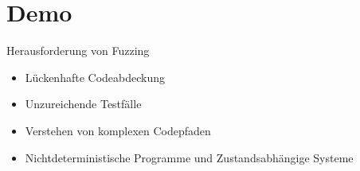 \section{Demo}\label{sec:demo2}
\begin{frame}{Herausforderung von Fuzzing}
    \begin{itemize}
        \item Lückenhafte Codeabdeckung
        \item Unzureichende Testfälle
        \item Verstehen von komplexen Codepfaden
        \item Nichtdeterministische Programme und Zustandsabhängige Systeme
    \end{itemize}
\end{frame}